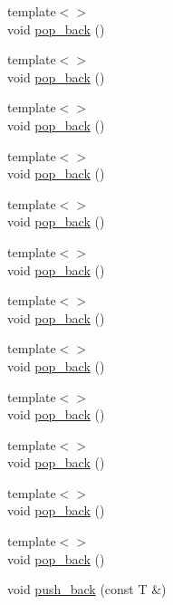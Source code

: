 \begin{DoxyCompactItemize}
\item 
{\footnotesize template$<$$>$ }\\void \mbox{\hyperlink{classvector_ad8894ea792178c89c0e39927c8feddea}{pop\+\_\+back}} ()
\item 
{\footnotesize template$<$$>$ }\\void \mbox{\hyperlink{classvector_ad8894ea792178c89c0e39927c8feddea}{pop\+\_\+back}} ()
\item 
{\footnotesize template$<$$>$ }\\void \mbox{\hyperlink{classvector_ad8894ea792178c89c0e39927c8feddea}{pop\+\_\+back}} ()
\item 
{\footnotesize template$<$$>$ }\\void \mbox{\hyperlink{classvector_ad8894ea792178c89c0e39927c8feddea}{pop\+\_\+back}} ()
\item 
{\footnotesize template$<$$>$ }\\void \mbox{\hyperlink{classvector_ad8894ea792178c89c0e39927c8feddea}{pop\+\_\+back}} ()
\item 
{\footnotesize template$<$$>$ }\\void \mbox{\hyperlink{classvector_ad8894ea792178c89c0e39927c8feddea}{pop\+\_\+back}} ()
\item 
{\footnotesize template$<$$>$ }\\void \mbox{\hyperlink{classvector_ad8894ea792178c89c0e39927c8feddea}{pop\+\_\+back}} ()
\item 
{\footnotesize template$<$$>$ }\\void \mbox{\hyperlink{classvector_ad8894ea792178c89c0e39927c8feddea}{pop\+\_\+back}} ()
\item 
{\footnotesize template$<$$>$ }\\void \mbox{\hyperlink{classvector_ad8894ea792178c89c0e39927c8feddea}{pop\+\_\+back}} ()
\item 
{\footnotesize template$<$$>$ }\\void \mbox{\hyperlink{classvector_ad8894ea792178c89c0e39927c8feddea}{pop\+\_\+back}} ()
\item 
{\footnotesize template$<$$>$ }\\void \mbox{\hyperlink{classvector_ad8894ea792178c89c0e39927c8feddea}{pop\+\_\+back}} ()
\item 
{\footnotesize template$<$$>$ }\\void \mbox{\hyperlink{classvector_ad8894ea792178c89c0e39927c8feddea}{pop\+\_\+back}} ()
\item 
void \mbox{\hyperlink{classvector_a8922d0954d738ead691e43d10c4f5d9f}{push\+\_\+back}} (const T \&)

\end{DoxyCompactItemize}

